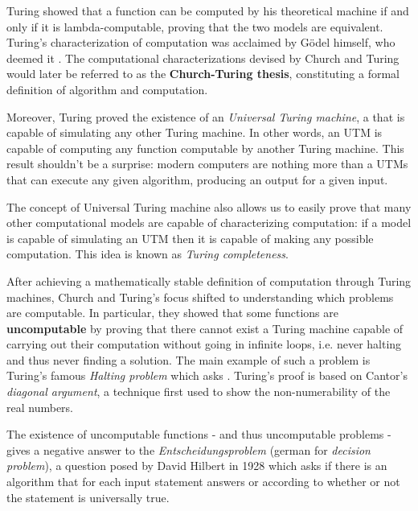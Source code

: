 Turing \cite{turing} showed that a function can be computed by his theoretical machine if and only if it is lambda-computable, proving that the two models are equivalent. Turing's characterization of computation was acclaimed by Gödel himself, who deemed it . The computational characterizations devised by Church and Turing would later be referred to as the \textbf{Church-Turing thesis}, constituting a formal definition of algorithm and computation.

Moreover, Turing proved the existence of an \textit{Universal Turing machine}, a \TM that is capable of simulating any other Turing machine. In other words, an \textsf{UTM} is capable of computing any function computable by another Turing machine. This result shouldn't be a surprise: modern computers are nothing more than a \textsf{UTM}s that can execute any given algorithm, producing an output for a given input.

The concept of Universal Turing machine also allows us to easily prove that many other computational models are capable of characterizing computation: if a model is capable of simulating an \textsf{UTM} then it is capable of making any possible computation. This idea is known as \textit{Turing completeness}.

After achieving a mathematically stable definition of computation through Turing machines, Church and Turing's focus shifted to understanding which problems are computable. In particular, they showed that some functions are \textbf{uncomputable} by proving that there cannot exist a Turing machine capable of carrying out their computation without going in infinite loops, i.e. never halting and thus never finding a solution. The main example of such a problem is Turing's famous \textit{Halting problem} which asks . Turing's proof is based on Cantor's \textit{diagonal argument}, a technique first used to show the non-numerability of the real numbers.

The existence of uncomputable functions - and thus uncomputable problems - gives a negative answer to the \textit{Entscheidungsproblem} (german for \textit{decision problem}), a question posed by David Hilbert in 1928 which asks if there is an algorithm that for each input statement answers  or  according to whether or not the statement is universally true.

\newpage

